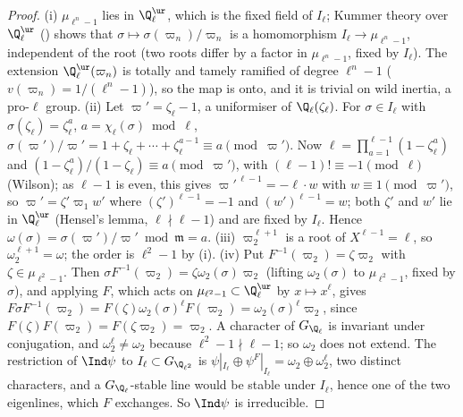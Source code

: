 \begin{proof}
(i) $\mu_{\ell^n-1}$ lies in $\Q_\ell^{\ur}$, which is the fixed field of $I_\ell$; Kummer theory over $\Q_\ell^{\ur}$ () shows that
$\sigma\mapsto\sigma(\varpi_n)/\varpi_n$ is a homomorphism $I_\ell\to\mu_{\ell^n-1}$, independent of the root (two roots differ by a factor in $\mu_{\ell^n-1}$, fixed by
$I_\ell$). The extension $\Q_\ell^{\ur}(\varpi_n)$ is totally and tamely ramified of degree $\ell^n-1$ ($v(\varpi_n)=1/(\ell^n-1)$), so the map is onto, and it is
trivial on wild inertia, a pro-$\ell$ group. (ii) Let $\varpi'=\zeta_\ell-1$, a uniformiser of $\Q_\ell(\zeta_\ell)$. For $\sigma\in I_\ell$ with $\sigma(\zeta_\ell)=\zeta_\ell^a$, $a=\chi_\ell(\sigma)\bmod\ell$,
$\sigma(\varpi')/\varpi'=1+\zeta_\ell+\cdots+\zeta_\ell^{a-1}\equiv a\pmod{\varpi'}$. Now $\ell=\prod_{a=1}^{\ell-1}(1-\zeta_\ell^a)$ and $(1-\zeta_\ell^a)/(1-\zeta_\ell)\equiv a\pmod{\varpi'}$, with $(\ell-1)!\equiv-1\pmod\ell$ (Wilson); as $\ell-1$ is even,
this gives $\varpi'^{\,\ell-1}=-\ell\cdot w$ with $w\equiv1\pmod{\varpi'}$, so $\varpi'=\zeta'\varpi_1w'$ where
$(\zeta')^{\ell-1}=-1$ and $(w')^{\ell-1}=w$; both $\zeta'$ and $w'$ lie in $\Q_\ell^{\ur}$ (Hensel's lemma, $\ell\nmid\ell-1$) and are fixed by $I_\ell$. Hence
$\omega(\sigma)=\sigma(\varpi')/\varpi'\bmod\mathfrak m=a$. (iii) $\varpi_2^{\ell+1}$ is a root of $X^{\ell-1}=\ell$, so $\omega_2^{\ell+1}=\omega$; the order is $\ell^2-1$ by (i). (iv) Put
$F^{-1}(\varpi_2)=\zeta\varpi_2$ with $\zeta\in\mu_{\ell^2-1}$. Then $\sigma F^{-1}(\varpi_2)=\zeta\omega_2(\sigma)\varpi_2$ (lifting $\omega_2(\sigma)$ to $\mu_{\ell^2-1}$, fixed by $\sigma$), and
applying $F$, which acts on $\mu_{\ell^2-1}\subset\Q_\ell^{\ur}$ by $x\mapsto x^\ell$, gives $F\sigma F^{-1}(\varpi_2)=F(\zeta)\omega_2(\sigma)^\ell F(\varpi_2)=\omega_2(\sigma)^\ell\varpi_2$, since
$F(\zeta)F(\varpi_2)=F(\zeta\varpi_2)=\varpi_2$. A character of $G_{\Q_\ell}$ is invariant under conjugation, and $\omega_2^\ell\ne\omega_2$ because $\ell^2-1\nmid\ell-1$; so $\omega_2$
does not extend. The restriction of $\Ind\psi$ to $I_\ell\subset G_{\Q_{\ell^2}}$ is $\psi|_{I_\ell}\oplus\psi^F|_{I_\ell}=\omega_2\oplus\omega_2^\ell$, two distinct characters, and a
$G_{\Q_\ell}$-stable line would be stable under $I_\ell$, hence one of the two eigenlines, which $F$ exchanges. So $\Ind\psi$ is irreducible.
\end{proof}

